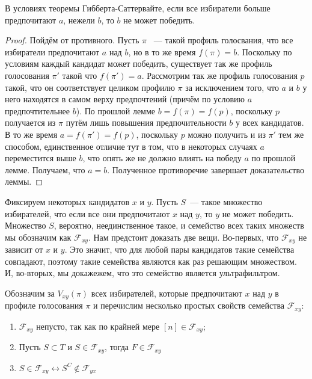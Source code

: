 \begin{lemma}
В условиях теоремы Гибберта-Саттервайте, если все избиратели больше предпочитают $a$, нежели $b$, то $b$ не может победить.
\end{lemma}
\begin{proof}
Пойдём от противного. Пусть $\pi$ ~--- такой профиль голосвания, что все избиратели предпочитают $a$ над $b$, но в то же время $f(\pi) = b$. Поскольку по условиям каждый кандидат может победить, существует так же профиль голосования $\pi'$ такой что $f(\pi') = a$. Рассмотрим так же профиль голосования $p$ такой, что он соответствует целиком профилю $\pi$ за исключением того, что $a$ и $b$ у него находятся в самом верху предпочтений (причём по условию $a$ предпочтительнее $b$). По прошлой лемме $b = f(\pi) = f(p)$, поскольку $p$ получается из $\pi$ путём лишь повышения предпочительности $b$ у всех кандидатов. В то же время $a = f(\pi') = f(p)$, поскольку $p$ можно получить и из $\pi'$ тем же способом, единственное отличие тут в том, что в некоторых случаях $a$ переместится выше $b$, что опять же не должно влиять на победу $a$ по прошлой лемме. Получаем, что $a=b$. Полученное противоречие завершает доказательство леммы.
\end{proof}

Фиксируем некоторых кандидатов $x$ и $y$. Пусть $S$~--- такое множество избирателей, что если все они предпочитают $x$ над $y$, то $y$ не может победить. Множество $S$, вероятно, неединственное такое, и семейство всех таких множеств мы обозначим как $\mathcal{F}_{xy}$. Нам предстоит доказать две вещи. Во-первых, что $\mathcal{F}_{xy}$ не зависит от $x$ и $y$. Это значит, что для любой пары кандидатов такие семейства совпадают, поэтому такие семейства являются как раз решающим множеством. И, во-вторых, мы докажежем, что это семейство является ультрафильтром.

Обозначим за $V_{xy}(\pi)$ всех избирателей, которые предпочитают $x$ над $y$ в профиле голосования $\pi$ и перечислим несколько простых свойств семейства $\mathcal{F}_{xy}$:

\begin{enumerate}
\item $\mathcal{F}_{xy}$ непусто, так как по крайней мере $[n]\in\mathcal{F}_{xy}$;
\item Пусть $S\subset T$ и $S \in \mathcal{F}_{xy}$, тогда $F\in\mathcal{F}_{xy}$
\item $S\in\mathcal{F}_{xy} \leftrightarrow S^C\not\in\mathcal{F}_{yx}$
\end{enumerate}

